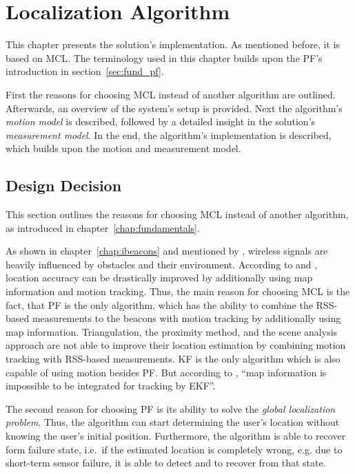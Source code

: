 \chapter{Localization Algorithm} \label{chap:pf}
This chapter presents the solution's implementation. As mentioned before, it is based on \acf{MCL}. The terminology used in this chapter builds upon the \acs{PF}'s introduction in section~\ref{sec:fund_pf}.

First the reasons for choosing \acs{MCL} instead of another algorithm are outlined. Afterwards, an overview of the system's setup is provided. Next the algorithm's \emph{motion model} is described, followed by a detailed insight in the solution's \emph{measurement model}. In the end, the algorithm's implementation is described, which builds upon the motion and measurement model.


\section{Design Decision} \label{sec:algo_decision}
This section outlines the reasons for choosing \acl{MCL} instead of another algorithm, as introduced in chapter~\ref{chap:fundamentals}.

As shown in chapter~\ref{chap:ibeacons} and mentioned by \citet{IEEE:survey_wireless_indoor_pos}, wireless signals are heavily influenced by obstacles and their environment. According to \citet{wang:wlan} and \citet{siddiqi:experiments_mcl_wifi}, location accuracy can be drastically improved by additionally using map information and motion tracking. Thus, the main reason for choosing \ac{MCL} is the fact, that \acl{PF} is the only algorithm, which has the ability to combine the \acs{RSS}-based measurements to the beacons with motion tracking by additionally using map information. Triangulation, the proximity method, and the scene analysis approach are not able to improve their location estimation by combining motion tracking with \ac{RSS}-based measurements. \acl{KF} is the only algorithm which is also capable of using motion besides \ac{PF}. But according to \citet{wang:wlan}, ``map information is impossible to be integrated for tracking by \acs{EKF}''.

The second reason for choosing \acs{PF} is its ability to solve the \emph{global localization problem}. Thus, the algorithm can start determining the user's location without knowing the user's initial position. Furthermore, the algorithm is able to recover form failure state, i.e.\ if the estimated location is completely wrong, e.g. due to short-term sensor failure, it is able to detect and to recover from that state.

